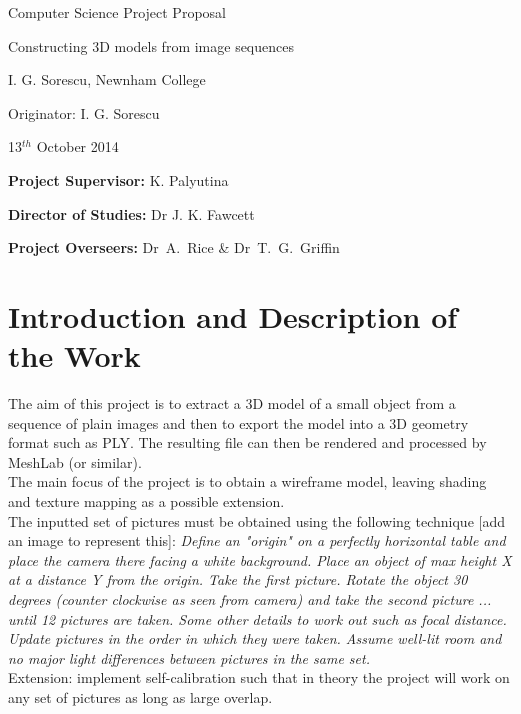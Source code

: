 

\vfil

\centerline{\Large Computer Science Project Proposal}
\vspace{0.4in}
\centerline{\Large Constructing 3D models from image sequences}
\vspace{0.4in}
\centerline{\large I. G. Sorescu, Newnham College}
\vspace{0.3in}
\centerline{\large Originator: I. G. Sorescu}
\vspace{0.3in}
\centerline{\large 13$^{th}$ October 2014}

\vfil


\noindent
{\bf Project Supervisor:} K. Palyutina
\vspace{0.2in}

\noindent
{\bf Director of Studies:} Dr J. K. Fawcett
\vspace{0.2in}
\noindent
 
\noindent
{\bf Project Overseers:} Dr~A.~Rice  \& Dr~T.~G.~Griffin



\section*{Introduction and Description of the Work}

The aim of this project is to extract a 3D model of a small object from a sequence of plain images and then to export the model into a 3D geometry format such as PLY. The resulting file can then be rendered and processed by MeshLab (or similar).  \\
The main focus of the project is to obtain a wireframe model, leaving shading and texture mapping as a possible extension. \\
The inputted set of pictures must be obtained using the following technique [add an image to represent this]: 
{\em Define an "origin" on a perfectly horizontal table and place the camera there facing a white background. Place an object of max height X at a distance Y from the origin. Take the first picture. Rotate the object 30 degrees (counter clockwise as seen from camera) and take the second picture ... until 12 pictures are taken. Some other details to work out such as focal distance. Update pictures in the order in which they were taken. Assume well-lit room and no major light differences between pictures in the same set.} \\
Extension: implement self-calibration such that in theory the project will work on any set of pictures as long as large overlap.

